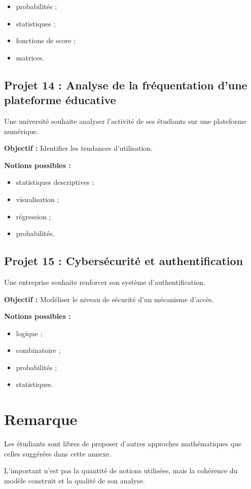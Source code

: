\documentclass[12pt,a4paper]{article}
\begin{document}
\begin{itemize}
\item probabilités ;
\item statistiques ;
\item fonctions de score ;
\item matrices.
\end{itemize}

\bigskip

\subsection*{Projet 14 : Analyse de la fréquentation d'une plateforme éducative}

Une université souhaite analyser l'activité de ses étudiants sur une plateforme numérique.

\textbf{Objectif :}
Identifier les tendances d'utilisation.

\textbf{Notions possibles :}

\begin{itemize}
\item statistiques descriptives ;
\item visualisation ;
\item régression ;
\item probabilités.
\end{itemize}

\bigskip

\subsection*{Projet 15 : Cybersécurité et authentification}

Une entreprise souhaite renforcer son système d'authentification.

\textbf{Objectif :}
Modéliser le niveau de sécurité d'un mécanisme d'accès.

\textbf{Notions possibles :}

\begin{itemize}
\item logique ;
\item combinatoire ;
\item probabilités ;
\item statistiques.
\end{itemize}

\bigskip

\section*{Remarque}

Les étudiants sont libres de proposer d'autres approches mathématiques que celles suggérées dans cette annexe.

L'important n'est pas la quantité de notions utilisées, mais la cohérence du modèle construit et la qualité de son analyse.
\end{document}

